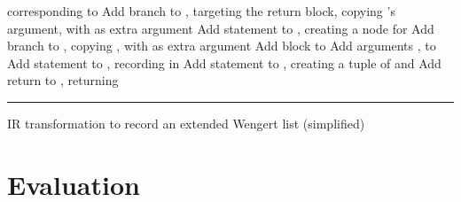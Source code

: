 \begin{algorithm}[p]
\begin{algorithmic}
    corresponding to 
    \State Add branch to , targeting the return block, copying 's
    argument, with  as extra argument
    \Else
    \State Add statement  to , creating a node for 
    \State Add branch to , copying , with  as
    extra argument
    \EndIf
    \EndFor
    \EndFor
    \Statex
    \State Add block  to 
    \State Add arguments ,  to 
    \State Add statement to , recording  in
    \State Add statement  to , creating a tuple of
     and 
    \State Add return to , returning 
  \end{algorithmic}
  \smallskip
  \hrule
  \caption{IR transformation to record an extended Wengert list (simplified) \label{alg:ir-transform}}
\end{algorithm}




\section{Evaluation}
\label{sec:irtracker-eval}


